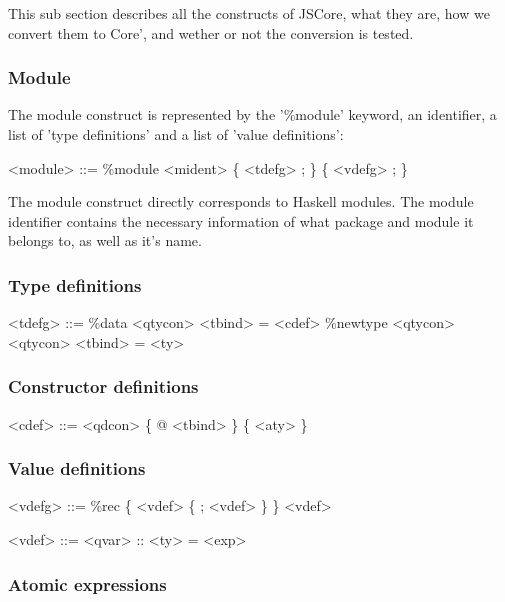 This sub section describes all the constructs of JSCore, what they are, how we 
convert them to Core', and wether or not the conversion is tested.

\subsubsection{Module}

The module construct is represented by the '\%module' keyword, an identifier,
a list of 'type definitions' and a list of 'value definitions':

\begin{grammar}
<module> ::= \%module <mident> \{ <tdefg> ; \} \{ <vdefg> ; \}
\end{grammar}

The module construct directly corresponds to Haskell modules. The module identifier
contains the necessary information of what package and module it belongs to, as
well as it's name.

\subsubsection{Type definitions}

\begin{grammar}
<tdefg> ::= \%data <qtycon> <tbind> = <cdef>
       \alt \%newtype <qtycon> <qtycon> <tbind> = <ty>
\end{grammar}


\subsubsection{Constructor definitions}

\begin{grammar}
<cdef> ::= <qdcon> \{ @ <tbind> \} \{ <aty> \}
\end{grammar}

\subsubsection{Value definitions}

\begin{grammar}
<vdefg> ::= \%rec \{ <vdef> \{ ; <vdef> \} \}
       \alt <vdef>
\end{grammar}

\begin{grammar}
<vdef> ::= <qvar> :: <ty> = <exp>
\end{grammar}

\subsubsection{Atomic expressions}

